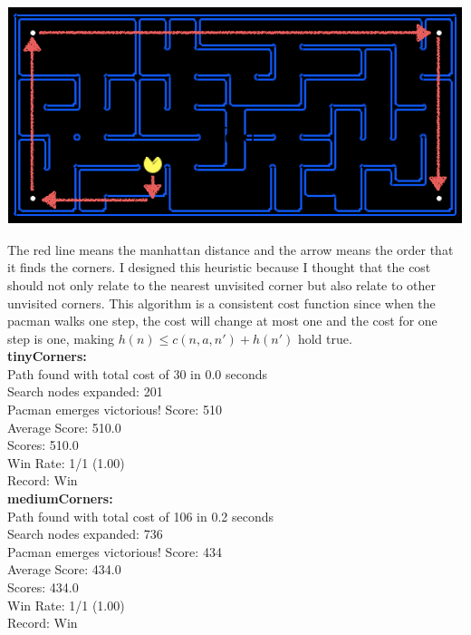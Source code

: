 \documentclass[11pt]{article}
\begin{document}
\begin{center}
\includegraphics[scale=0.8]{cornerHeuristic}\\
\end{center}

\noindent
The red line means the manhattan distance and the arrow means the order that it finds the corners. I designed this heuristic because I thought that the cost should not only relate to the nearest unvisited corner but also relate to other unvisited corners. This algorithm is a consistent cost function since when the pacman walks one step, the cost will change at most one and the cost for one step is one, making $h(n) \leq c(n, a, n') + h(n')$ hold true.\\

\noindent
\textbf{tinyCorners:}\\
Path found with total cost of 30 in 0.0 seconds\\
Search nodes expanded: 201\\
Pacman emerges victorious! Score: 510\\
Average Score: 510.0\\
Scores:        510.0\\
Win Rate:      1/1 (1.00)\\
Record:        Win\\

\noindent
\textbf{mediumCorners:}\\
Path found with total cost of 106 in 0.2 seconds\\
Search nodes expanded: 736\\
Pacman emerges victorious! Score: 434\\
Average Score: 434.0\\
Scores:        434.0\\
Win Rate:      1/1 (1.00)\\
Record:        Win\\
\end{document}
